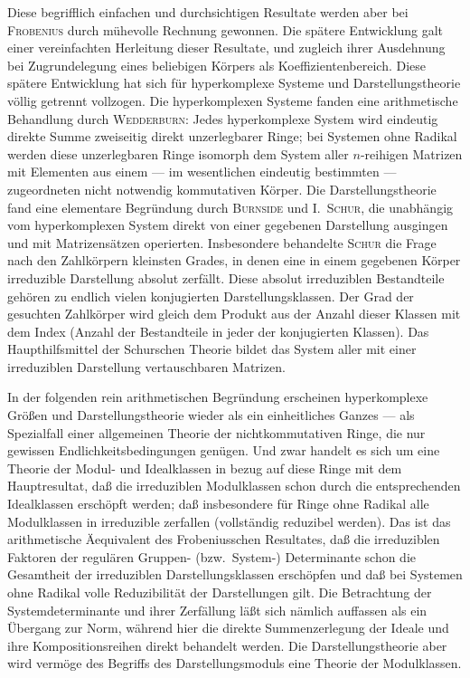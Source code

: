 \documentclass[12pt,a4paper]{article}
\theoremstyle{definition}
\begin{document}
Diese begrifflich einfachen und durchsichtigen Resultate werden aber bei
\textsc{Frobenius} durch m\"uhevolle Rechnung gewonnen. Die sp\"atere
Entwicklung galt einer vereinfachten Herleitung dieser Resultate, und
zugleich ihrer Ausdehnung bei Zugrundelegung eines beliebigen K\"orpers
als Koeffizientenbereich. Diese sp\"atere Entwicklung hat sich f\"ur
hyperkomplexe Systeme und Darstellungstheorie v\"ollig getrennt
vollzogen. Die hyperkomplexen Systeme fanden eine arithmetische
Behandlung durch \textsc{Wedderburn}: Jedes hyperkomplexe System wird
eindeutig direkte Summe zweiseitig direkt unzerlegbarer Ringe; bei
Systemen ohne Radikal werden diese unzerlegbaren Ringe isomorph dem
System aller $n$-reihigen Matrizen mit Elementen aus einem --- im
wesentlichen eindeutig bestimmten --- zugeordneten nicht notwendig
kommutativen K\"orper. Die Darstellungstheorie fand eine elementare
Begr\"undung durch \textsc{Burnside} und I.\ \textsc{Schur}, die
unabh\"angig vom hyperkomplexen System direkt von einer gegebenen
Darstellung ausgingen und mit Matrizens\"atzen operierten. Insbesondere
behandelte \textsc{Schur} die Frage nach den Zahlk\"orpern kleinsten
Grades, in denen eine in einem gegebenen K\"orper irreduzible Darstellung
absolut zerf\"allt. Diese absolut irreduziblen Bestandteile geh\"oren zu
endlich vielen konjugierten Darstellungsklassen. Der Grad der gesuchten
Zahlk\"orper wird gleich dem Produkt aus der Anzahl dieser Klassen mit
dem Index (Anzahl der Bestandteile in jeder der konjugierten Klassen).
Das Haupthilfsmittel der Schurschen Theorie bildet das System aller mit
einer irreduziblen Darstellung vertauschbaren Matrizen.

In der folgenden rein arithmetischen Begr\"undung erscheinen
hyperkomplexe Gr\"o\ss en und Darstellungstheorie wieder als ein
einheitliches Ganzes --- als Spezialfall einer allgemeinen Theorie der
nichtkommutativen Ringe, die nur gewissen Endlichkeitsbedingungen
gen\"ugen. Und zwar handelt es sich um eine Theorie der Modul- und
Idealklassen in bezug auf diese Ringe mit dem Hauptresultat, da\ss{} die
irreduziblen Modulklassen schon durch die entsprechenden Idealklassen
ersch\"opft werden; da\ss{} insbesondere f\"ur Ringe ohne Radikal alle
Modulklassen in irreduzible zerfallen (vollst\"andig reduzibel werden).
Das ist das arithmetische \"Aequivalent des Frobeniusschen Resultates,
da\ss{} die irreduziblen Faktoren der regul\"aren Gruppen- (bzw.\ System-)
Determinante schon die Gesamtheit der irreduziblen Darstellungsklassen
ersch\"opfen und da\ss{} bei Systemen ohne Radikal volle Reduzibilit\"at
der Darstellungen gilt. Die Betrachtung der Systemdeterminante und ihrer
Zerf\"allung l\"a\ss t sich n\"amlich auffassen als ein \"Ubergang zur
Norm, w\"ahrend hier die direkte Summenzerlegung der Ideale und ihre
Kompositionsreihen direkt behandelt werden. Die Darstellungstheorie aber
wird verm\"oge des Begriffs des Darstellungsmoduls eine Theorie der
Modulklassen.
\end{document}
